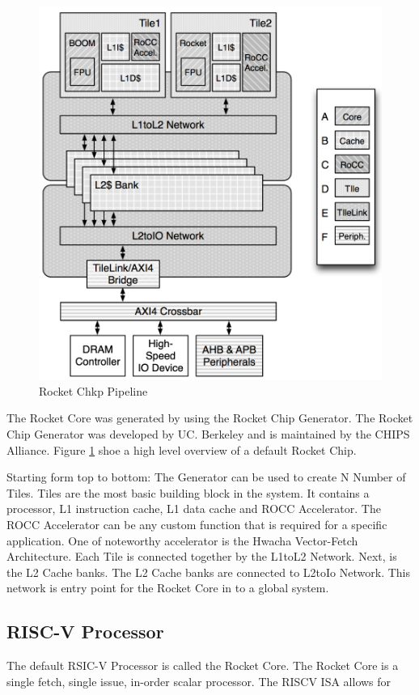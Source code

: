 \documentclass[../main.tex]{subfiles}
\begin{document}
\begin{figure}
    \centering
    \includegraphics[scale=.5]{pngs/RocketChipGeneratorLayout.png}
    \caption{Rocket Chkp Pipeline\cite{Asanović:EECS-2016-17}}
    \label{fig:RocketCipGen}
\end{figure}
The Rocket Core was generated by using the Rocket Chip Generator. The Rocket Chip Generator was developed by UC. Berkeley and is maintained by the CHIPS Alliance. Figure \ref{fig:RocketCipGen} shoe a high level overview of a default Rocket Chip. 

Starting form top to bottom: The Generator can be used to create N Number of Tiles. Tiles are the most basic building block in the system. It contains a processor, L1 instruction cache, L1 data cache and ROCC Accelerator. The ROCC Accelerator can be any custom function that is required for a specific application. One of noteworthy accelerator is the Hwacha Vector-Fetch Architecture\cite{HwachaPaper}. Each Tile is connected together by the L1toL2 Network. Next, is the L2 Cache banks. The L2 Cache banks are connected to L2toIo Network. This network is entry point for the Rocket Core in to a global system.
\subsection{RISC-V Processor}
The default RSIC-V Processor is called the Rocket Core. The Rocket Core is a single fetch, single issue, in-order scalar processor. The RISCV ISA allows for 
\end{document}
